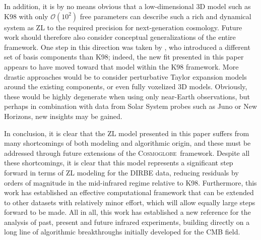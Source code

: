 \documentclass[twocolumn]{aa}
\newcommand{\cosmoglobe}{\textsc{Cosmoglobe}}
\begin{document}
In addition, it is by no means obvious that a low-dimensional 3D model
such as K98 with only $\mathcal{O}(10^2)$ free parameters can describe
such a rich and dynamical system as ZL to the required precision for
next-generation cosmology. Future work should therefore also consider
conceptual generalizations of the entire framework. One step in this
direction was taken by \citet{Robinson2013}, who introduced a
different set of basis components than K98; indeed, the new fit
presented in this paper appears to have moved toward that model within
the K98 framework. More drastic approaches would be to consider
perturbative Taylor expansion models around the existing components,
or even fully voxelized 3D models. Obviously, these would be highly
degenerate when using only near-Earth observations, but perhaps
in combination with data from Solar System probes such as Juno or New
Horizons, new insights may be gained.

In conclusion, it is clear that the ZL model presented in this paper
suffers from many shortcomings of both modeling and algorithmic
origin, and these must be addressed through future extensions of
the \cosmoglobe\ framework. Despite all these
shortcomings, it is clear that this model represents a significant
step forward in terms of ZL modeling for the DIRBE data, reducing residuals
by orders of magnitude in the mid-infrared regime relative to K98. Furthermore, this
work has established an effective computational framework that can
be extended to other datasets with relatively minor effort, which 
will allow equally large steps forward to be made. All in all, this
work has established a new reference for the analysis of past, present
and future infrared experiments, building directly on a long line of
algorithmic breakthroughs initially developed for the CMB field.
\end{document}
